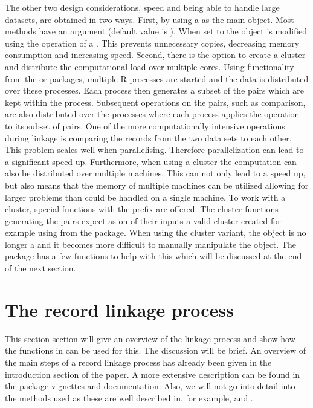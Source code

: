 The other two design considerations, speed and being able to handle large datasets, are obtained in
two ways. First, by using a  as the main object. Most methods have an
 argument (default value is ). When set to  the  object
is modified using the \code{[, :=]} operation of a . This prevents unnecessary copies,
decreasing memory consumption and increasing speed. Second, there is the option to create a cluster
and distribute the computational load over multiple cores. 
Using functionality from the  or  \citep{snow}
packages, multiple R processes are started and the data is distributed over these processes. Each
process then generates a subset of the pairs which are kept within the process. Subsequent
operations on the pairs, such as comparison, are also distributed over the processes where each
process applies the operation to its subset of pairs.  One of the more computationally intensive
operations during linkage is comparing the records from the two data sets to each other. This
problem scales well when parallelising.  Therefore parallelization can lead to a significant speed
up. Furthermore, when using a  cluster the computation can also be distributed over
multiple machines. This can not only lead to a speed up, but also means that the memory of multiple
machines can be utilized allowing for larger problems than could be handled on a single machine.  To
work with a cluster, special functions with the  prefix are offered. The cluster
functions generating the pairs expect as on of their inputs a valid cluster created for example
using  from the  package.  When using the cluster variant, the
object is no longer a  and it becomes more difficult to manually manipulate the
object. The package has a few functions to help with this which will be discussed at the end of the
next section.



\section{The record linkage process}

This section section will give an overview of the linkage process and show how the functions in 
 can be used for this. The discussion will be brief. An overview of the main steps of a
record linkage process has already been given in the introduction section of the paper. 
A more extensive description can be found in the package vignettes and documentation. Also, we will not
go into detail into the methods used as these are well described in, for example, \citet{herzog} and
\citet{datamatching}. 

